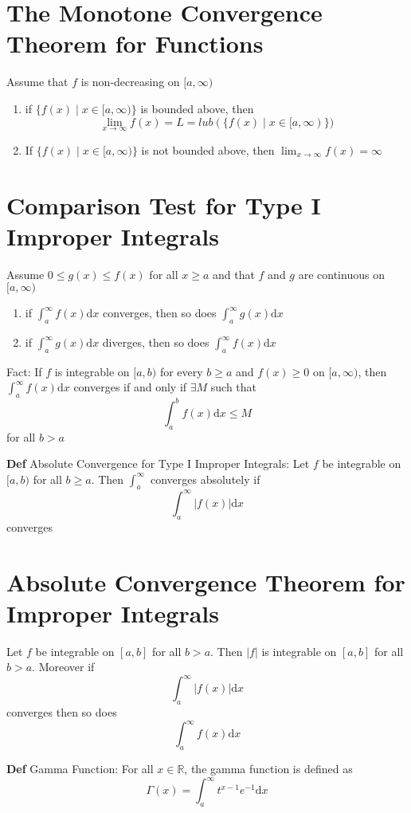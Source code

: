 \documentclass[11pt,notitlepage]{report}
\begin{document}
\section{The Monotone Convergence Theorem for Functions}Assume that $f$ is non-decreasing on $[a, \infty)$
\begin{enumerate}
    \item if $\{f(x)\mid x \in [a, \infty)\}$ is bounded above, then 
    $$\lim_{x \rightarrow \infty} f(x) = L = lub(\{f(x)\mid x \in [a, \infty)\})$$
    \item If $\{f(x)\mid x \in [a, \infty)\}$ is not bounded above, then $\lim_{x \rightarrow \infty} f(x) = \infty$
\end{enumerate}

\section{Comparison Test for Type I Improper Integrals}Assume $0 \leq g(x) \leq f(x)$ for all $x \geq a$ and that $f$ and $g$ are continuous on $[a, \infty)$
\begin{enumerate}
    \item if $\int_a^\infty f(x) \mathrm{d}x$ converges, then so does $\int_a^\infty g(x) \mathrm{d}x$
    \item if $\int_a^\infty g(x) \mathrm{d}x$ diverges, then so does $\int_a^\infty f(x) \mathrm{d}x$
\end{enumerate}
\hspace*{5mm} Fact: If $f$ is integrable on $[a, b)$ for every $b \geq a$ and $f(x) \geq 0$ on $[a, \infty)$, then $\int_a^\infty f(x)\mathrm{d}x$ converges if and only if $\exists M$ such that $$\int_a^b f(x) \mathrm{d}x \leq M$$ for all $b > a$

\textbf{Def} Absolute Convergence for Type I Improper Integrals: Let $f$ be integrable on $[a, b)$ for all $b \geq a$. Then $\int^\infty_a$ converges absolutely if $$\int^\infty_a |f(x)| \mathrm{d}x$$ converges

\section{Absolute Convergence Theorem for Improper Integrals}Let $f$ be integrable on $[a, b]$ for all $b > a$. Then $|f|$ is integrable on $[a, b]$ for all $b > a$. Moreover if $$\int_a^\infty |f(x)| \mathrm{d}x$$ converges then so does $$\int_a^\infty f(x) \mathrm{d}x$$

\textbf{Def} Gamma Function: For all $x \in \mathbb R$, the gamma function is defined as $$\Gamma(x) = \int^\infty_a t^{x-1}e^{-1} \mathrm{d}x$$
\end{document}
